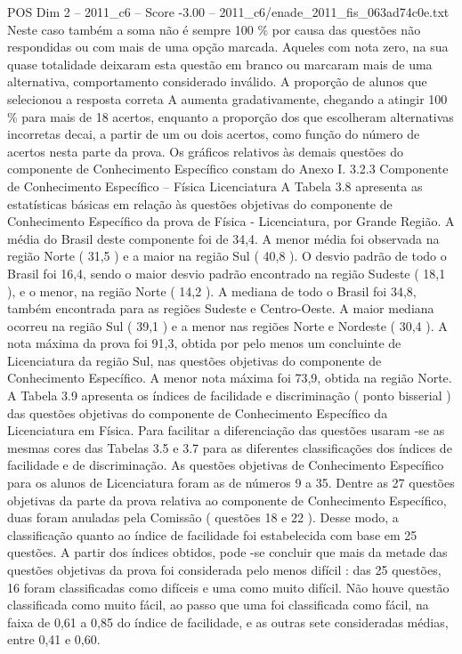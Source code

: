 \begin{textsample}{POS Dim 2 – 2011\_c6 – Score -3.00 – 2011\_c6/enade\_2011\_fis\_063ad74c0e.txt}
Neste caso também a soma não é sempre 100 \% por causa das questões não respondidas ou com mais de uma opção marcada.
Aqueles com nota zero, na sua quase totalidade deixaram esta questão em branco ou marcaram mais de uma alternativa, comportamento considerado inválido.
A proporção de alunos que selecionou a resposta correta A aumenta gradativamente, chegando a atingir 100 \% para mais de 18 acertos, enquanto a proporção dos que escolheram alternativas incorretas decai, a partir de um ou dois acertos, como função do número de acertos nesta parte da prova.
Os gráficos relativos às demais questões do componente de Conhecimento Específico constam do Anexo I. 3.2.3 Componente de Conhecimento Específico – Física Licenciatura A Tabela 3.8 apresenta as estatísticas básicas em relação às questões objetivas do componente de Conhecimento Específico da prova de Física - Licenciatura, por Grande Região.
A média do Brasil deste componente foi de 34,4.
A menor média foi observada na região Norte ( 31,5 ) e a maior na região Sul ( 40,8 ).
O desvio padrão de todo o Brasil foi 16,4, sendo o maior desvio padrão encontrado na região Sudeste ( 18,1 ), e o menor, na região Norte ( 14,2 ).
A mediana de todo o Brasil foi 34,8, também encontrada para as regiões Sudeste e Centro-Oeste.
A maior mediana ocorreu na região Sul ( 39,1 ) e a menor nas regiões Norte e Nordeste ( 30,4 ).
A nota máxima da prova foi 91,3, obtida por pelo menos um concluinte de Licenciatura da região Sul, nas questões objetivas do componente de Conhecimento Específico.
A menor nota máxima foi 73,9, obtida na região Norte.
A Tabela 3.9 apresenta os índices de facilidade e discriminação ( ponto bisserial ) das questões objetivas do componente de Conhecimento Específico da Licenciatura em Física.
Para facilitar a diferenciação das questões usaram -se as mesmas cores das Tabelas 3.5 e 3.7 para as diferentes classificações dos índices de facilidade e de discriminação.
As questões objetivas de Conhecimento Específico para os alunos de Licenciatura foram as de números 9 a 35.
Dentre as 27 questões objetivas da parte da prova relativa ao componente de Conhecimento Específico, duas foram anuladas pela Comissão ( questões 18 e 22 ).
Desse modo, a classificação quanto ao índice de facilidade foi estabelecida com base em 25 questões.
A partir dos índices obtidos, pode -se concluir que mais da metade das questões objetivas da prova foi considerada pelo menos difícil : das 25 questões, 16 foram classificadas como difíceis e uma como muito difícil.
Não houve questão classificada como muito fácil, ao passo que uma foi classificada como fácil, na faixa de 0,61 a 0,85 do índice de facilidade, e as outras sete consideradas médias, entre 0,41 e 0,60.

\end{textsample}
